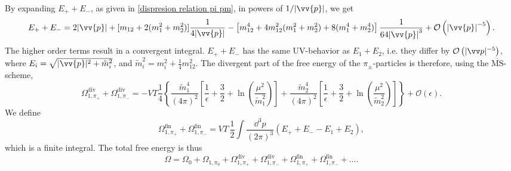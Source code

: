 By expanding $E_+ + E_-$, as given in \autoref{dispresion relation pi pm}, in powers of $1 / \abs{\vv{p}}$, we get 
\begin{equation}
    E_+ + E_-
    = 2  \abs{\vv{p}}
    + [m_{12} + 2(m_1^2 + m_2^2)]\frac{1}{4 \abs{\vv{p}}}
    - \left[ m_{12}^4 + 4 m_{12}^2(m_1^2 + m_2^2) + 8(m_1^4 + m_2^4) \right] \frac{1}{64 \abs{\vv{p}}^3}
    + \Oh[-5]{ \abs{\vv{p}}}.
\end{equation}
The higher order terms result in a convergent integral.
$E_+ + E_-$ has the same UV-behavior as $E_1 + E_2$, i.e. they differ by  $\Oh[-5]{|\vv p|}$, where $E_i = \sqrt{|\vv{p}|^2 + \tilde m_i^2}$, and $\tilde m_i^2 = m_i^2 + \frac{1}{4} m_{12}^2$. 
The divergent part of the free energy of the $\pi_\pm$-particles is therefore, using the $\mathrm{\overline{MS}}$-scheme, 
\begin{equation}
    \Omega^{\mathrm{div}}_{1, \pi_+} + \Omega^{\mathrm{div}}_{1, \pi_-}
    = 
    - VT \frac{1}{4}
    \left\{
        \frac{\tilde m_1^4}{(4\pi)^2} 
        \left[
            \frac{1}{\epsilon} + \frac{3}{2} + \ln(\frac{\mu^2}{\tilde m_1^2}) 
        \right]
        +
        \frac{\tilde m_2^4}{(4\pi)^2} 
        \left[
            \frac{1}{\epsilon} + \frac{3}{2} + \ln(\frac{\mu^2}{\tilde m_2^2})
        \right] 
    \right\} 
    + \mathcal{O}(\epsilon).
\end{equation}
We define
\begin{equation}
    \Omega^{\mathrm{fin}}_{1, \pi_+} + \Omega^{\mathrm{fin}}_{1, \pi_-}
    = 
    V T \, \frac{1}{2} \int \frac{\dd^3 p}{(2\pi)^3} (E_+ + E_- - E_1 + E_2),
\end{equation}
which is a finite integral.
The total free energy is thus
\begin{equation}
    \Omega = \Omega_0 
    + \Omega_{1, \pi_0} 
    + \Omega^{\mathrm{div}}_{1, \pi_+} + \Omega^{\mathrm{div}}_{1, \pi_-}
    + \Omega^{\mathrm{fin}}_{1, \pi_+} + \Omega^{\mathrm{fin}}_{1, \pi_-}
    + \dots.
\end{equation}
